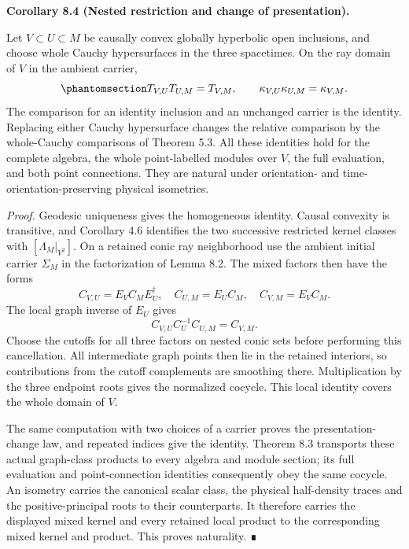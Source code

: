 \documentclass[
  english,
  11pt,
  reqno]{amsart}
\makeatletter
\newcommand{\pandocstatementheading}[1]{%
  \par\if@nobreak\else
    \addpenalty{\@beginparpenalty}%
    \addvspace{.5\baselineskip plus .2\baselineskip minus .2\baselineskip}%
  \fi
  {\normalfont\bfseries #1\par}%
  \nobreak\@afterindenttrue\@afterheading
}
\makeatother
\begin{document}
\pandocstatementheading{\protect{}\label{cor:relative-carrier-coherence}Corollary 8.4 (Nested restriction and change of presentation).}

Let \(V\subset U\subset M\) be causally convex globally hyperbolic open
inclusions, and choose whole Cauchy hypersurfaces in the three
spacetimes. On the ray domain of \(V\) in the ambient carrier,
\begin{equation}\protect\phantomsection\label{eq:relative-carrier-cocycle}{
T_{V,U}T_{U,M}=T_{V,M},
\qquad
\kappa_{V,U}\kappa_{U,M}=\kappa_{V,M}.
}\end{equation} The comparison for an identity inclusion and an
unchanged carrier is the identity. Replacing either Cauchy hypersurface
changes the relative comparison by the whole-Cauchy comparisons of
Theorem 5.3. All these identities hold for the complete algebra, the
whole point-labelled modules over \(V\), the full evaluation, and both
point connections. They are natural under orientation- and
time-orientation-preserving physical isometries.

\emph{Proof.} Geodesic uniqueness gives the homogeneous identity. Causal
convexity is transitive, and Corollary 4.6 identifies the two successive
restricted kernel classes with \([\Lambda_M|_{V^2}]\). On a retained
conic ray neighborhood use the ambient initial carrier \(\Sigma_M\) in
the factorization of Lemma 8.2. The mixed factors then have the forms \[
C_{V,U}=E_VC_ME_U^{\dagger},
\quad C_{U,M}=E_UC_M,
\quad C_{V,M}=E_VC_M.
\] The local graph inverse of \(E_U\) gives \[
C_{V,U}C_U^{-1}C_{U,M}=C_{V,M}.
\] Choose the cutoffs for all three factors on nested conic sets before
performing this cancellation. All intermediate graph points then lie in
the retained interiors, so contributions from the cutoff complements are
smoothing there. Multiplication by the three endpoint roots gives the
normalized cocycle. This local identity covers the whole domain of
\(V\).

The same computation with two choices of a carrier proves the
presentation-change law, and repeated indices give the identity. Theorem
8.3 transports these actual graph-class products to every algebra and
module section; its full evaluation and point-connection identities
consequently obey the same cocycle. An isometry carries the canonical
scalar class, the physical half-density traces and the
positive-principal roots to their counterparts. It therefore carries the
displayed mixed kernel and every retained local product to the
corresponding mixed kernel and product. This proves naturality. ∎
\end{document}
